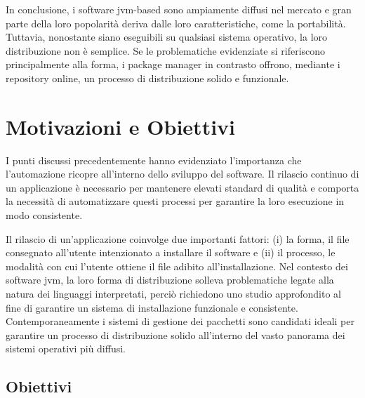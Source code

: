 In conclusione, i software \ac{jvm}-based sono ampiamente diffusi nel mercato e gran parte della loro popolarità deriva dalle loro caratteristiche, come la portabilità. Tuttavia, nonostante siano eseguibili su qualsiasi sistema operativo, la loro distribuzione non è semplice. Se le problematiche evidenziate si riferiscono principalmente alla forma, i package manager in contrasto offrono, mediante i repository online, un processo di distribuzione solido e funzionale.

\section{Motivazioni e Obiettivi}
I punti discussi precedentemente hanno evidenziato l'importanza che l'automazione ricopre all'interno dello sviluppo del software. Il rilascio continuo di un applicazione è necessario per mantenere elevati standard di qualità e comporta la necessità di automatizzare questi processi per garantire la loro esecuzione in modo consistente. 

Il rilascio di un'applicazione coinvolge due importanti fattori: (i) la forma, il file consegnato all'utente intenzionato a installare il software e (ii) il processo, le modalità con cui l'utente ottiene il file adibito all'installazione. Nel contesto dei software \ac{jvm}, la loro forma di distribuzione solleva problematiche legate alla natura dei linguaggi interpretati, perciò richiedono uno studio approfondito al fine di garantire un sistema di installazione funzionale e consistente. Contemporaneamente i sistemi di gestione dei pacchetti sono candidati ideali per garantire un processo di distribuzione solido all'interno del vasto panorama dei sistemi operativi più diffusi.

\subsection{Obiettivi}

